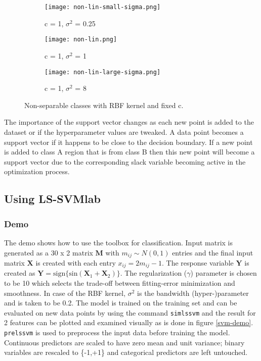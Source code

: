 \documentclass[paper=a4, fontsize=11pt]{scrartcl} %
\numberwithin{equation}{section} %
\begin{document}
\begin{figure}[ht]
\centering
\begin{subfigure}[b]{0.3\textwidth}
		\centering
		\texttt{[image: non-lin-small-sigma.png]}
		\caption{c = 1, $\sigma^2$ = 0.25}
	\end{subfigure}
	\begin{subfigure}[b]{0.3\textwidth}
		\centering
		\texttt{[image: non-lin.png]}
		\caption{c = 1, $\sigma^2$ = 1}
	\end{subfigure}
	\begin{subfigure}[b]{0.3\textwidth}
		\centering
		\texttt{[image: non-lin-large-sigma.png]}
		\caption{c = 1, $\sigma^2$ = 8}
	\end{subfigure}
\caption{Non-separable classes with RBF kernel and fixed c.}
\label{non-sep-fixed-c}
\end{figure} 

The importance of the support vector changes as each new point is added to the dataset or if the hyperparameter values are tweaked. A data point becomes a support vector if it happens to be close to the decision boundary. If a new point is added to class A region that is from class B then this new point will become a support vector due to the corresponding slack variable becoming active in the optimization process.

\subsection{Using LS-SVMlab}

\subsubsection{Demo}

The demo shows how to use the toolbox for classification. Input matrix is generated as a 30 x 2 matrix $\mathbf{M}$ with $m_{ij} \sim N(0,1)$ entries and the final input matrix $\mathbf{X}$ is created with each entry $x_{ij} = 2 m_{ij} - 1$. The response variable $\mathbf{Y}$ is created as $\mathbf{Y} = \text{sign\{sin}(\textbf{X}_1 + \textbf{X}_2)\}$. The regularization ($\gamma$) parameter is chosen to be 10 which selects the trade-off between fitting-error minimization and smoothness. In case of the RBF kernel, $\sigma^2$ is the bandwidth (hyper-)parameter and is taken to be 0.2. The model is trained on the training set and can be evaluated on new data points by using the command \texttt{simlssvm} and the result for 2 features can be plotted and examined visually as is done in figure \ref{svm-demo}. \texttt{prelssvm} is used to preprocess the input data before training the model. Continuous predictors are scaled to have zero mean and unit variance; binary variables are rescaled to \{-1,+1\} and categorical predictors are left untouched. 
\end{document}
